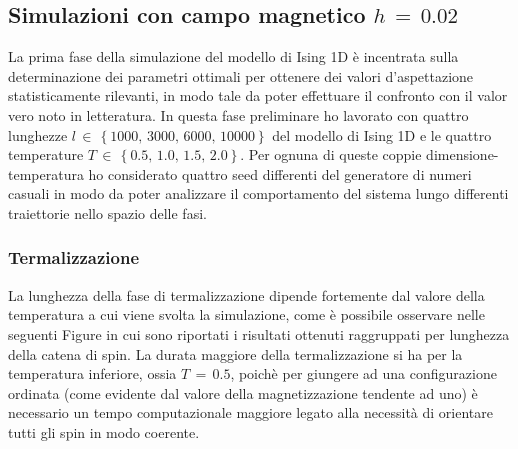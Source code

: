 \subsection{Simulazioni con campo magnetico $h\,=\,0.02$}

La prima fase della simulazione del modello di Ising 1D è incentrata sulla determinazione dei parametri ottimali per ottenere 
dei valori d'aspettazione statisticamente rilevanti, in modo tale da poter effettuare il confronto con il valor vero noto in letteratura. In 
questa fase preliminare ho lavorato con quattro lunghezze $l\,\in\,\left\{1000,\,3000,\,6000,\,10000\right\}$ del modello di Ising 1D e 
le quattro temperature $T\,\in\,\left\{0.5,\,1.0,\,1.5,\,2.0\right\}$. Per ognuna di queste coppie dimensione-temperatura 
ho considerato quattro seed differenti del generatore di numeri casuali in modo da poter analizzare il comportamento del sistema 
lungo differenti traiettorie nello spazio delle fasi. 



\subsubsection{Termalizzazione}

La lunghezza della fase di termalizzazione dipende fortemente dal valore della temperatura a cui viene svolta la simulazione, come è 
possibile osservare nelle seguenti Figure in cui sono riportati i risultati ottenuti raggruppati per lunghezza della catena di spin. 
La durata maggiore della termalizzazione si ha per la temperatura inferiore, ossia $T\,=\,0.5$, poichè per giungere ad una configurazione 
ordinata (come evidente dal valore della magnetizzazione tendente ad uno) è necessario un tempo computazionale maggiore legato alla 
necessità di orientare tutti gli spin in modo coerente.

\newpage

\vspace*{\fill}

